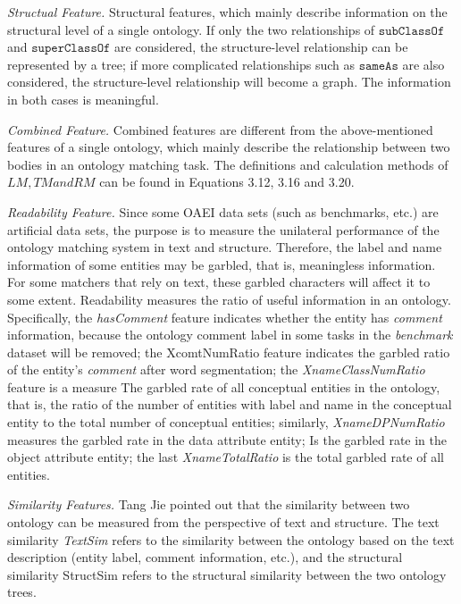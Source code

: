 \documentclass[twoside]{article}
\begin{document}
{\it Structual Feature.}  Structural features, which mainly describe information on the structural level of a single ontology.
If only the two relationships of $\texttt{subClassOf}$ and $\texttt{superClassOf}$ are considered, the structure-level relationship can be represented by a tree; if more complicated relationships such as $\texttt{sameAs}$ are also considered, the structure-level relationship will become a graph. The information in both cases is meaningful.

{\it Combined Feature.} Combined features are different from the above-mentioned features of a single ontology, which mainly describe the relationship between two bodies in an ontology matching task. The definitions and calculation methods of $LM, TM and RM$ can be found in Equations 3.12, 3.16 and 3.20.

{\it Readability Feature.} Since some OAEI data sets (such as benchmarks, etc.) are artificial data sets, the purpose is to measure the unilateral performance of the ontology matching system in text and structure.
Therefore, the label and name information of some entities may be garbled, that is, meaningless information.
For some matchers that rely on text, these garbled characters will affect it to some extent.
Readability measures the ratio of useful information in an ontology.
Specifically, the {\it hasComment} feature indicates whether the entity has {\it comment} information, because the ontology comment label in some tasks in the {\it benchmark} dataset will be removed; the XcomtNumRatio feature indicates the garbled ratio of the entity's {\it comment} after word segmentation; the {\it XnameClassNumRatio} feature is a measure The garbled rate of all conceptual entities in the ontology, that is, the ratio of the number of entities with label and name in the conceptual entity to the total number of conceptual entities; similarly, {\it XnameDPNumRatio} measures the garbled rate in the data attribute entity; Is the garbled rate in the object attribute entity; the last {\it XnameTotalRatio} is the total garbled rate of all entities.

{\it Similarity Features.} Tang Jie\cite{tyz74} pointed out that the similarity between two ontology can be measured from the perspective of text and structure. The text similarity {\it TextSim} refers to the similarity between the ontology based on the text description (entity label, comment information, etc.), and the structural similarity StructSim refers to the structural similarity between the two ontology trees.
\end{document}
